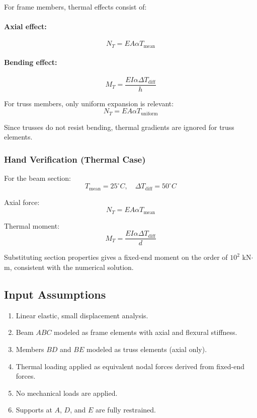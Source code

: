 For frame members, thermal effects consist of:

\paragraph{Axial effect:}
\[
N_T = E A \alpha T_{\text{mean}}
\]

\paragraph{Bending effect:}
\[
M_T = \frac{E I \alpha \Delta T_{\text{diff}}}{h}
\]

For truss members, only uniform expansion is relevant:
\[
N_T = E A \alpha T_{\text{uniform}}
\]

Since trusses do not resist bending, thermal gradients are ignored for truss elements.

\subsubsection*{Hand Verification (Thermal Case)}

For the beam section:
\[
T_{\text{mean}} = 25^\circ C,\quad
\Delta T_{\text{diff}} = 50^\circ C
\]

Axial force:
\[
N_T = EA\alpha T_{\text{mean}}
\]

Thermal moment:
\[
M_T = \frac{EI\alpha \Delta T_{\text{diff}}}{d}
\]

Substituting section properties gives a fixed-end moment on the order of
$10^2$ kN$\cdot$m, consistent with the numerical solution.

\subsection{Input Assumptions}

\begin{enumerate}
    \item Linear elastic, small displacement analysis.
    \item Beam $ABC$ modeled as frame elements with axial and flexural stiffness.
    \item Members $BD$ and $BE$ modeled as truss elements (axial only).
    \item Thermal loading applied as equivalent nodal forces derived from fixed-end forces.
    \item No mechanical loads are applied.
    \item Supports at $A$, $D$, and $E$ are fully restrained.
\end{enumerate}

